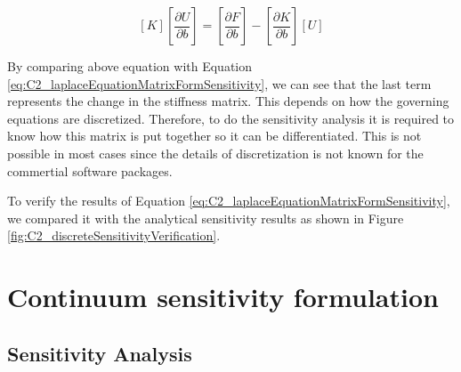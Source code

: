 \begin{equation*}
	\left[ K \right] \left[ \frac{\partial U}{\partial b} \right] = 
	\left[ \frac{\partial F}{\partial b} \right] - 
		\left[ \frac{\partial K}{\partial b} \right] \left[ U \right]
\end{equation*}

By comparing above equation with Equation \eqref{eq:C2_laplaceEquationMatrixFormSensitivity}, we can see that the last term represents the change in the stiffness matrix. This depends on how the governing equations are discretized. Therefore, to do the sensitivity analysis it is required to know how this matrix is put together so it can be differentiated. This is not possible in most cases since the details of discretization is not known for the commertial software packages.

To verify the results of Equation \eqref{eq:C2_laplaceEquationMatrixFormSensitivity}, we compared it with the analytical sensitivity results as shown in Figure \ref{fig:C2_discreteSensitivityVerification}.
\section{Continuum sensitivity formulation}

\subsection{Sensitivity Analysis}
